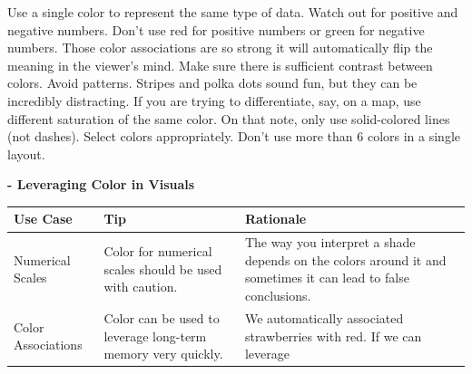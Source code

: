 \documentclass[]{book}
\theoremstyle{definition}
\theoremstyle{definition}
\theoremstyle{definition}
\theoremstyle{remark}
\begin{document}
Use a single color to represent the same type of data. Watch out for
positive and negative numbers. Don't use red for positive numbers or
green for negative numbers. Those color associations are so strong it
will automatically flip the meaning in the viewer's mind. Make sure
there is sufficient contrast between colors. Avoid patterns. Stripes and
polka dots sound fun, but they can be incredibly distracting. If you are
trying to differentiate, say, on a map, use different saturation of the
same color. On that note, only use solid-colored lines (not dashes).
Select colors appropriately. Don't use more than 6 colors in a single
layout.

\textbf{- Leveraging Color in Visuals}

\begin{longtable}[]{@{}lll@{}}
\toprule
\begin{minipage}[b]{0.10\columnwidth}\raggedright\strut
Use Case\strut
\end{minipage} & \begin{minipage}[b]{0.29\columnwidth}\raggedright\strut
Tip\strut
\end{minipage} & \begin{minipage}[b]{0.39\columnwidth}\raggedright\strut
Rationale\strut
\end{minipage}\tabularnewline
\midrule
\endhead
\begin{minipage}[t]{0.10\columnwidth}\raggedright\strut
Numerical Scales\strut
\end{minipage} & \begin{minipage}[t]{0.29\columnwidth}\raggedright\strut
Color for numerical scales should be used with caution.\strut
\end{minipage} & \begin{minipage}[t]{0.39\columnwidth}\raggedright\strut
The way you interpret a shade depends on the colors around it and
sometimes it can lead to false conclusions.\strut
\end{minipage}\tabularnewline
\begin{minipage}[t]{0.10\columnwidth}\raggedright\strut
Color Associations\strut
\end{minipage} & \begin{minipage}[t]{0.29\columnwidth}\raggedright\strut
Color can be used to leverage long-term memory very quickly.\strut
\end{minipage} & \begin{minipage}[t]{0.39\columnwidth}\raggedright\strut
We automatically associated strawberries with red. If we can leverage

\end{minipage}
\end{longtable}
\end{document}
